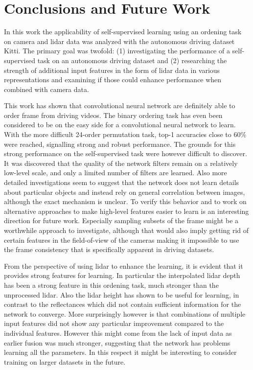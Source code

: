 %

\chapter{Conclusions and Future Work}
\label{ch:conclusion}
In this work the applicability of self-supervised learning using an ordening task on camera and lidar data was analyzed with the autonomous driving dataset Kitti\cite{geiger2012}. The primary goal was twofold: (1) investigating the performance of a self-supervised task on an autonomous driving dataset and (2) researching the strength of additional input features in the form of lidar data in various representations and examining if those could enhance performance when combined with camera data.

This work has shown that convolutional neural network are definitely able to order frame from driving videos. The binary ordering task has even been considered to be on the easy side for a convolutional neural network to learn. With the more difficult 24-order permutation task, top-1 accuracies close to 60\% were reached, signalling strong and robust performance. The grounds for this strong performance on the self-supervised task were however difficult to discover. It was discovered that the quality of the network filters remain on a relatively low-level scale, and only a limited number of filters are learned. Also more detailed investigations seem to suggest that the network does not learn details about particular objects and instead rely on general correlation between images, although the exact mechanism is unclear. To verify this behavior and to work on alternative approaches to make high-level features easier to learn is an interesting direction for future work. Especially sampling subsets of the frame might be a worthwhile approach to investigate, although that would also imply getting rid of certain features in the field-of-view of the cameras making it impossible to use the frame consistency that is specifically apparent in driving datasets.  

From the perspective of using lidar to enhance the learning, it is evident that it provides strong features for learning. In particular the interpolated lidar depth has been a strong feature in this ordening task, much stronger than the unprocessed lidar. Also the lidar height has shown to be useful for learning, in contrast to the reflectances which did not contain sufficient information for the network to converge. More surprisingly however is that combinations of multiple input features did not show any particular improvement compared to the individual features. However this might come from the lack of input data as earlier fusion was much stronger, suggesting that the network has problems learning all the parameters. In this respect it might be interesting to consider training on larger datasets in the future.

